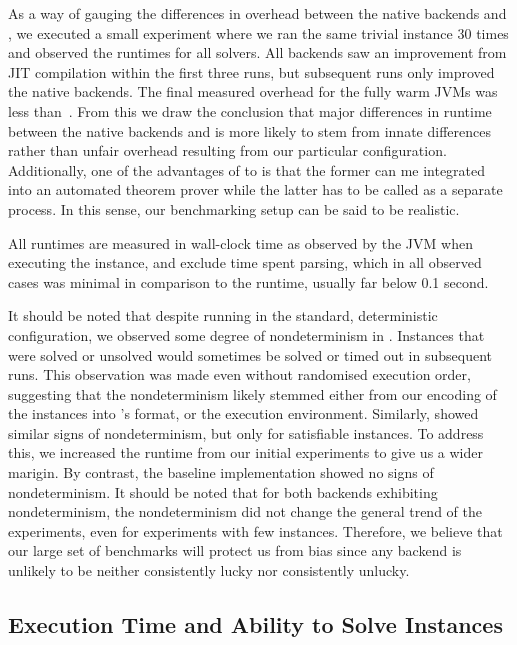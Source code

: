\documentclass[acmsmall,review,anonymous,screen]{acmart}\settopmatter{printfolios=true,printccs=false,printacmref=true}
\theoremstyle{definition}
\begin{document}
As a way of gauging the differences in overhead between the native backends and
\Nuxmv, we executed a small experiment where we ran the same trivial instance 30
times and observed the runtimes for all solvers. All backends saw an improvement
from JIT compilation within the first three runs, but subsequent runs only
improved the native backends. The final measured overhead for the fully warm
JVMs was less than~\OverheadSeconds. From this we draw the conclusion that major
differences in runtime between the native backends and \Nuxmv{} is more likely
to stem from innate differences rather than unfair overhead resulting from our
particular configuration. Additionally, one of the advantages of \Calculus{} to
\Nuxmv{} is that the former can me integrated into an automated theorem prover
while the latter has to be called as a separate process. In this sense, our
benchmarking setup can be said to be realistic.

All runtimes are measured in wall-clock time as observed by the JVM when executing the instance, and exclude time spent parsing, which in all observed cases was minimal in comparison to the runtime, usually far below 0.1 second.

It should be noted that despite running in the standard, deterministic
configuration, we observed some degree of nondeterminism in \Nuxmv. Instances
that were solved or unsolved would sometimes be solved or timed out in
subsequent runs. This observation was made even without randomised execution
order, suggesting that the nondeterminism likely stemmed either from our
encoding of the instances into \Nuxmv's format, or the execution environment.
Similarly, \Calculus{} showed similar signs of nondeterminism, but only for
satisfiable instances. To address this, we increased the runtime from our
initial experiments to give us a wider marigin. By contrast, the baseline
implementation showed no signs of nondeterminism. It should be noted that for
both backends exhibiting nondeterminism, the nondeterminism did not change the
general trend of the experiments, even for experiments with few instances.
Therefore, we believe that our large set of benchmarks will protect us from bias
since any backend is unlikely to be neither consistently lucky nor consistently
unlucky.

\subsection{Execution Time and Ability to Solve Instances}\label{sec:runtime}
\end{document}
